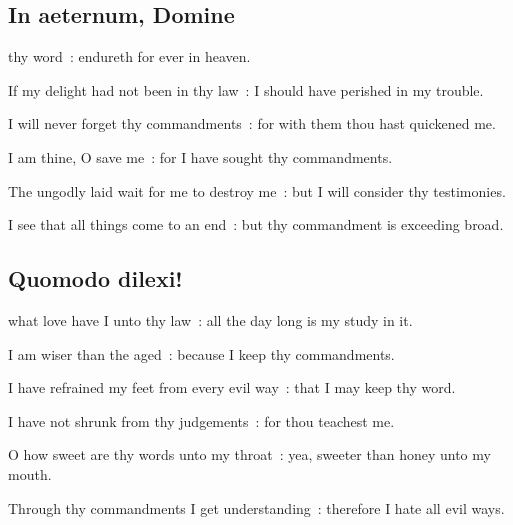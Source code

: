 \subsection{In aeternum, Domine}


 thy word~: endureth for ever in heaven.\par
{}
If my delight had not been in thy law~: I should have perished in my trouble.\par
{}I will never forget thy commandments~: for with them thou hast quickened me.\par
{}I am thine, O save me~: for I have sought thy commandments.\par
{}The ungodly laid wait for me to destroy me~: but I will consider thy testimonies.\par
{}I see that all things come to an end~: but thy commandment is exceeding broad.\par

\subsection{Quomodo dilexi!}


 what love have I unto thy law~: all the day long is my study in it.\par
{}
I am wiser than the aged~: because I keep thy commandments.\par
{}I have refrained my feet from every evil way~: that I may keep thy word.\par
{}I have not shrunk from thy judgements~: for thou teachest me.\par
{}O how sweet are thy words unto my throat~: yea, sweeter than honey unto my mouth.\par
{}Through thy commandments I get understanding~: therefore I hate all evil ways.\par



